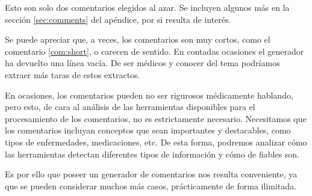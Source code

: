 \begin{thm}
\end{thm}
\begin{thm}
\end{thm}

Esto son solo dos comentarios elegidos al azar. Se incluyen algunos más en la sección \ref{sec:comments} del apéndice, por si resulta de interés.

Se puede apreciar que, a veces, los comentarios son muy cortos, como el comentario \ref{com:short}, o carecen de sentido. En contadas ocasiones el generador ha devuelto una línea vacía. De ser médicos y conocer del tema podríamos extraer más taras de estos extractos. 

En ocasiones, los comentarios pueden no ser rigurosos médicamente hablando, pero esto, de cara al análisis de las herramientas disponibles para el procesamiento de los comentarios, no es estrictamente necesario. Necesitamos que los comentarios incluyan conceptos que sean importantes y destacables, como tipos de enfermedades, medicaciones, etc. De esta forma, podremos analizar cómo las herramientas detectan diferentes tipos de información y cómo de fiables son. 

Es por ello que poseer un generador de comentarios nos resulta conveniente, ya que se pueden considerar muchos más casos, prácticamente de forma ilimitada.